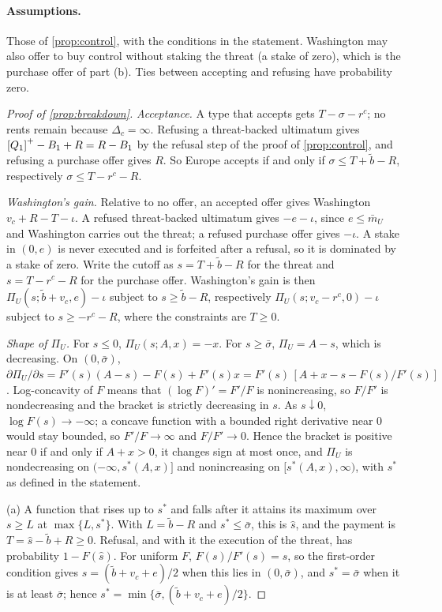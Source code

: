 \paragraph{Assumptions.} Those of \cref{prop:control}, with the conditions in the statement. Washington may also offer to buy control without staking the threat (a stake of zero), which is the purchase offer of part (b). Ties between accepting and refusing have probability zero.

\begin{proof}[Proof of \cref{prop:breakdown}]
\emph{Acceptance.} A type that accepts gets $T-\sigma-r^c$; no rents remain because $\Delta_c=\infty$. Refusing a threat-backed ultimatum gives $\left[Q_1\right]^{+}-B_1+R=R-B_1$ by the refusal step of the proof of \cref{prop:control}, and refusing a purchase offer gives $R$. So Europe accepts if and only if $\sigma\le T+\tilde b-R$, respectively $\sigma\le T-r^c-R$.

\emph{Washington's gain.} Relative to no offer, an accepted offer gives Washington $v_c+R-T-\iota$. A refused threat-backed ultimatum gives $-e-\iota$, since $e\le\bar m_U$ and Washington carries out the threat; a refused purchase offer gives $-\iota$. A stake in $(0,e)$ is never executed and is forfeited after a refusal, so it is dominated by a stake of zero. Write the cutoff as $s=T+\tilde b-R$ for the threat and $s=T-r^c-R$ for the purchase offer. Washington's gain is then $\Pi_U(s;\tilde b+v_c,e)-\iota$ subject to $s\ge\tilde b-R$, respectively $\Pi_U(s;v_c-r^c,0)-\iota$ subject to $s\ge -r^c-R$, where the constraints are $T\ge 0$.

\emph{Shape of $\Pi_U$.} For $s\le 0$, $\Pi_U(s;A,x)=-x$. For $s\ge\bar\sigma$, $\Pi_U=A-s$, which is decreasing. On $(0,\bar\sigma)$, $\partial\Pi_U/\partial s=F'(s)(A-s)-F(s)+F'(s)x=F'(s)\,[A+x-s-F(s)/F'(s)]$. Log-concavity of $F$ means that $(\log F)'=F'/F$ is nonincreasing, so $F/F'$ is nondecreasing and the bracket is strictly decreasing in $s$. As $s\downarrow 0$, $\log F(s)\to-\infty$; a concave function with a bounded right derivative near $0$ would stay bounded, so $F'/F\to\infty$ and $F/F'\to 0$. Hence the bracket is positive near $0$ if and only if $A+x>0$, it changes sign at most once, and $\Pi_U$ is nondecreasing on $(-\infty,s^*(A,x)]$ and nonincreasing on $[s^*(A,x),\infty)$, with $s^*$ as defined in the statement.

(a) A function that rises up to $s^*$ and falls after it attains its maximum over $s\ge L$ at $\max\{L,s^*\}$. With $L=\tilde b-R$ and $s^*\le\bar\sigma$, this is $\hat s$, and the payment is $T=\hat s-\tilde b+R\ge 0$. Refusal, and with it the execution of the threat, has probability $1-F(\hat s)$. For uniform $F$, $F(s)/F'(s)=s$, so the first-order condition gives $s=(\tilde b+v_c+e)/2$ when this lies in $(0,\bar\sigma)$, and $s^*=\bar\sigma$ when it is at least $\bar\sigma$; hence $s^*=\min\{\bar\sigma,(\tilde b+v_c+e)/2\}$.


\end{proof}
